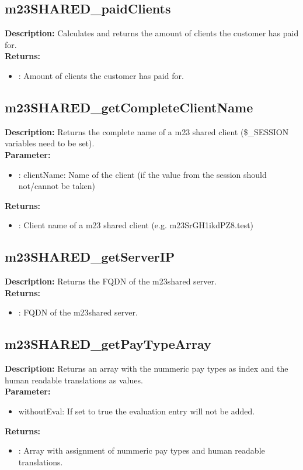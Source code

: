 \subsection{m23SHARED\_paidClients}
\textbf{Description:} Calculates and returns the amount of clients the customer has paid for.\\
\textbf{Returns:}
\begin{itemize}
\item : Amount of clients the customer has paid for.
\end{itemize}

\subsection{m23SHARED\_getCompleteClientName}
\textbf{Description:} Returns the complete name of a m23 shared client (\$\_SESSION variables need to be set).\\
\textbf{Parameter:}
\begin{itemize}
\item : clientName: Name of the client (if the value from the session should not/cannot be taken)
\end{itemize}
\textbf{Returns:}
\begin{itemize}
\item : Client name of a m23 shared client (e.g. m23SrGH1ikdPZ8.test)
\end{itemize}

\subsection{m23SHARED\_getServerIP}
\textbf{Description:} Returns the FQDN of the m23shared server.\\
\textbf{Returns:}
\begin{itemize}
\item : FQDN of the m23shared server.
\end{itemize}

\subsection{m23SHARED\_getPayTypeArray}
\textbf{Description:} Returns an array with the nummeric pay types as index and the human readable translations as values.\\
\textbf{Parameter:}
\begin{itemize}
\item withoutEval: If set to true the evaluation entry will not be added.
\end{itemize}
\textbf{Returns:}
\begin{itemize}
\item : Array with assignment of nummeric pay types and human readable translations.
\end{itemize}

